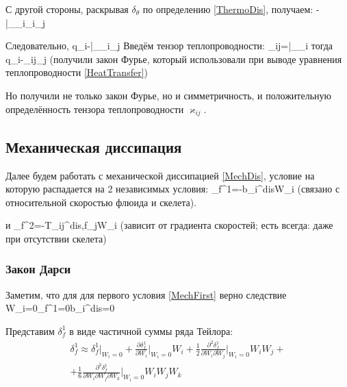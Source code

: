 \documentclass[main.tex]{subfiles}
\begin{document}
С другой стороны, раскрывая $\delta_\theta$ по определению \eqref{ThermoDis}, получаем:
\beq
-\approx{}\bigg|_{\nabla_i}\nabla_i\theta\nabla_j\theta
\eeq

Следовательно,
\beq\label{StandardThermo}
q_i\approx-\theta\cdot{}\bigg|_{\nabla_i}\nabla_j\theta
\eeq
Введём тензор теплопроводности:
\beq
\displaystyle{}\varkappa_{ij}=\theta\cdot{}\bigg|_{\nabla_i}
\eeq
тогда
\beq\label{FourierLow}
q_i\approx-\varkappa_{ij}\nabla_j\theta
\eeq
(получили закон Фурье, который использовали при выводе уравнения теплопроводности \eqref{HeatTransfer})

Но получили не только закон Фурье, но и симметричность, и положительную определённость тензора теплопроводности $\varkappa_{ij}$.

\subsection{Механическая диссипация}

Далее будем работать с механической диссипацией \eqref{MechDis}, условие на которую распадается на 2 независимых условия:
\beq\label{MechFirst}
\delta_f^1=-b_i^{dis}W_i
\eeq
(связано с относительной скоростью флюида и скелета).

и
\beq\label{MechSecond}
\delta_f^2=-T_{ij}^{dis,f}\partial_jW_i
\eeq
(зависит от градиента скоростей; есть всегда: даже при отсутствии скелета)

\subsubsection{Закон Дарси}

Заметим, что для для первого условия \eqref{MechFirst} верно следствие
\beq\label{Important}
W_i=0\Rightarrow\delta_f^1=0b_i^{dis}=0
\eeq

Представим $\delta_f^1$ в виде частичной суммы ряда Тейлора:
\begin{multline}\label{MechFirstFullT}
\delta_f^1\approx\delta_f^1\bigg|_{W_i=0}+\frac{\partial\delta_f^1}{\partial W_i}\bigg|_{W_i=0}W_i+\frac{1}{2}\frac{\partial^2\delta_f^1}{\partial W_i\partial W_j}\bigg|_{W_i=0}W_iW_j+\\+\frac{1}{6}\frac{\partial^3\delta_f^1}{\partial W_i\partial W_j \partial W_k}\bigg|_{W_i=0}W_iW_jW_k
\end{multline}
\end{document}
